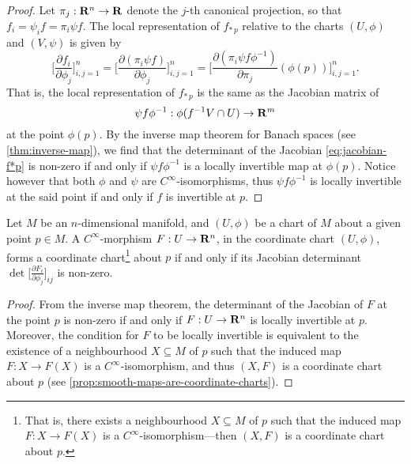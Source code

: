 \begin{proof}
Let \(\pi_j: \mathbf{R}^n \to \mathbf{R}\) denote the \(j\)-th canonical projection, so that
\(f_i = \psi_i f = \pi_i \psi f\). The local representation of \(f_{*\, p}\)
relative to the charts \((U, \phi)\) and \((V, \psi)\) is given by
\begin{equation}\label{eq:jacobian-f*p}
\Big[ \frac{\partial f_{i}}{\partial \phi_{j}} \Big]_{i, j=1}^n
= \Big[ \frac{\partial (\pi_i \psi f)}{\partial \phi_{j}} \Big]_{i, j=1}^n
= \Big[
\frac{\partial (\pi_i \psi f \phi^{-1})}{\partial \pi_j}(\phi(p))
\Big]_{i, j=1}^n.
\end{equation}
That is, the local representation of \(f_{*\, p}\) is the same as the Jacobian
matrix of
\[
\psi f \phi^{-1}: \phi(f^{-1} V \cap U) \to \mathbf{R}^m
\]
at the point \(\phi(p)\). By the inverse map theorem for Banach spaces (see
\cref{thm:inverse-map}), we find that the determinant of the Jacobian
\cref{eq:jacobian-f*p} is non-zero if and only if \(\psi f \phi^{-1}\) is a
locally invertible map at \(\phi(p)\). Notice however that both \(\phi\) and
\(\psi\) are \(C^{\infty}\)-isomorphisms, thus \(\psi f \phi^{-1}\) is locally
invertible at the said point if and only if \(f\) is invertible at \(p\).
\end{proof}

\begin{corollary}
\label{cor:inverse-map-theorem-manifolds}
Let \(M\) be an \(n\)-dimensional manifold, and \((U, \phi)\) be a chart of
\(M\) about a given point \(p \in M\). A \(C^{\infty}\)-morphism
\(F: U \to \mathbf{R}^n\), in the coordinate chart \((U, \phi)\), forms a coordinate
chart\footnote{
  That is, there exists a neighbourhood \(X \subseteq M\) of \(p\)
  such that the induced map \(F: X \to F(X)\) is a
  \(C^{\infty}\)-isomorphism---then \((X, F)\) is a coordinate chart about
  \(p\).
} about \(p\) if and only if its Jacobian determinant
\(\det \big[\frac{\partial F_{i}}{\partial \phi_j}\big]_{ij}\) is non-zero.
\end{corollary}

\begin{proof}
From the inverse map theorem, the determinant of the Jacobian of \(F\) at the
point \(p\) is non-zero if and only if \(F: U \to \mathbf{R}^n\) is locally invertible
at \(p\). Moreover, the condition for \(F\) to be locally invertible is
equivalent to the existence of a neighbourhood \(X \subseteq M\) of \(p\) such
that the induced map \(F: X \to F(X)\) is a \(C^{\infty}\)-isomorphism, and thus
\((X, F)\) is a coordinate chart about \(p\) (see
\cref{prop:smooth-maps-are-coordinate-charts}).
\end{proof}

